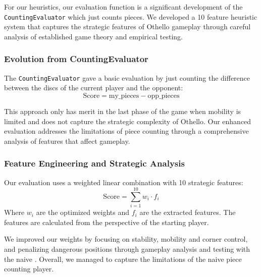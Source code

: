 \documentclass[10pt, titlepage, oneside, a4paper]{article}
\begin{document}
For our heuristics, our evaluation function is a significant development of the \texttt{CountingEvaluator} which just counts pieces. We developed a 10 feature heuristic system that captures the strategic features of Othello gameplay through careful analysis of established game theory and empirical testing.

\subsubsection{Evolution from CountingEvaluator}
The \texttt{CountingEvaluator} gave a basic evaluation by just counting the difference between the discs of the current player and the opponent:
\begin{equation}
\text{Score} = \text{my\_pieces} - \text{opp\_pieces}
\end{equation}

This approach only has merit in the last phase of the game when mobility is limited and does not capture the strategic complexity of Othello. Our enhanced evaluation addresses the limitations of piece counting through a comprehensive analysis of features that affect gameplay.

\subsubsection{Feature Engineering and Strategic Analysis}

Our evaluation uses a weighted linear combination \cite{russell2020artificial} with 10 strategic features:
\begin{equation}
\text{Score} = \sum_{i=1}^{10} w_i \cdot f_i
\end{equation}
Where $w_i$ are the optimized weights and $f_i$ are the extracted features. The features are calculated from the perspective of the starting player.

We improved our weights by focusing on stability, mobility and corner control, and penalizing dangerous positions through gameplay analysis and testing with the naive \textcite{brianothello2005}.
Overall, we managed to capture the limitations of the naive piece counting player.
\end{document}

